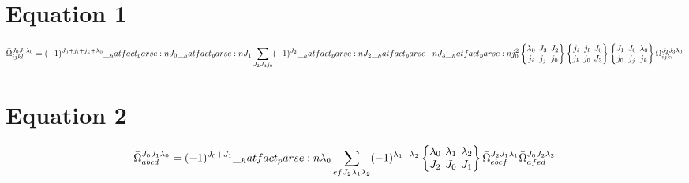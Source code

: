 \documentclass{scrartcl}
\newcommand{\sixj}[6]{\begingroup\setlength{\arraycolsep}{0.2em}\begin{Bmatrix} #1 & #2 & #3 \\ #4 & #5 & #6 \end{Bmatrix}\endgroup}
\begin{document}
\section{Equation 1}
\begin{dmath*}
\bar{\Omega}_{i j k l}^{{J}_{0} {J}_{1} {{\lambda}}_{0}} = (-1)^{{J}_{0}+{j}_{i}+{j}_{k}+{{\lambda}}_{0}} \* \hatfact{{J}_{0}} \* \hatfact{{J}_{1}} \* \sum_{{J}_{2} {J}_{3} {j}_{0}} \* (-1)^{{J}_{2}} \* \hatfact{{J}_{2}} \* \hatfact{{J}_{3}} \* \hatfact{{j}_{0}^{2}} \* \sixj{{{\lambda}}_{0}}{{J}_{3}}{{J}_{2}}{{j}_{i}}{{j}_{j}}{{j}_{0}} \* \sixj{{j}_{i}}{{j}_{l}}{{J}_{0}}{{j}_{k}}{{j}_{0}}{{J}_{3}} \* \sixj{{J}_{1}}{{J}_{0}}{{{\lambda}}_{0}}{{j}_{0}}{{j}_{j}}{{j}_{k}} \* \Omega_{i j k l}^{{J}_{2} {J}_{3} {{\lambda}}_{0}}
\end{dmath*}

\section{Equation 2}
\begin{dmath*}
\bar{\Omega}_{a b c d}^{{J}_{0} {J}_{1} {{\lambda}}_{0}} = (-1)^{{J}_{0}+{J}_{1}} \* \hatfact{{{\lambda}}_{0}} \* \sum_{e f {J}_{2} {{\lambda}}_{1} {{\lambda}}_{2}} \* (-1)^{{{\lambda}}_{1}+{{\lambda}}_{2}} \* \sixj{{{\lambda}}_{0}}{{{\lambda}}_{1}}{{{\lambda}}_{2}}{{J}_{2}}{{J}_{0}}{{J}_{1}} \* \bar{\Omega}_{e b c f}^{{J}_{2} {J}_{1} {{\lambda}}_{1}} \* \bar{\Omega}_{a f e d}^{{J}_{0} {J}_{2} {{\lambda}}_{2}}
\end{dmath*}
\end{document}
